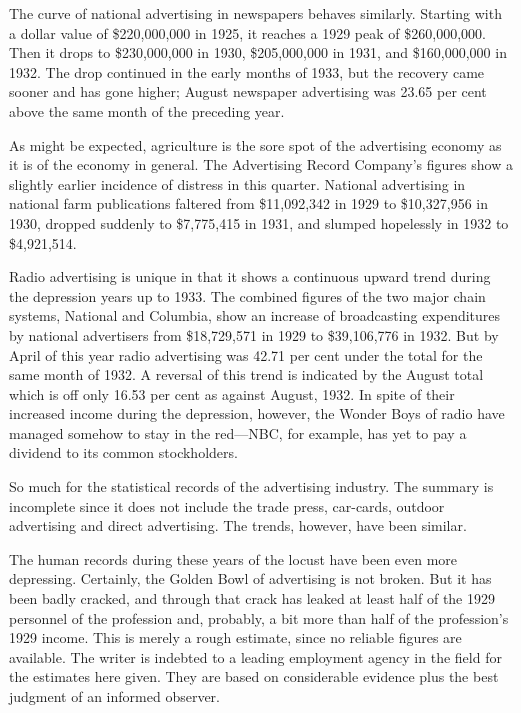 \documentclass[nohyper,openany,nobib]{tufte-book}
\begin{document}
The curve of national advertising in newspapers behaves similarly.
Starting with a dollar value of \$220,000,000 in 1925, it reaches a 1929
peak of \$260,000,000. Then it drops to \$230,000,000 in 1930,
\$205,000,000 in 1931, and \$160,000,000 in 1932. The drop continued in
the early months of 1933, but the recovery came sooner and has gone
higher; August newspaper advertising was 23.65 per cent above the same
month of the preceding year.

As might be expected, agriculture is the sore spot of the advertising
economy as it is of the economy in general. The Advertising Record
Company's figures show a slightly earlier incidence of distress in this
quarter. National advertising in national farm publications faltered
from \$11,092,342 in 1929 to \$10,327,956 in 1930, dropped suddenly to
\$7,775,415 in 1931, and slumped hopelessly in 1932 to \$4,921,514.

Radio advertising is unique in that it shows a continuous upward trend
during the depression years up to 1933. The combined figures of the two
major chain systems, National and Columbia, show an increase of
broadcasting expenditures by national advertisers from \$18,729,571 in
1929 to \$39,106,776 in 1932. But by April of this year radio
advertising was 42.71 per cent under the total for the same month of
1932. A reversal of this trend is indicated by the August total which is
off only 16.53 per cent as against August, 1932. In spite of their
increased income during the depression, however, the Wonder Boys of
radio have managed somehow to stay in the red---NBC, for example, has
yet to pay a dividend to its common stockholders.

So much for the statistical records of the advertising industry. The
summary is incomplete since it does not include the trade press,
car-cards, outdoor advertising and direct advertising. The trends,
however, have been similar.

The human records during these years of the locust have been even more
depressing. Certainly, the Golden Bowl of advertising is not broken. But
it has been badly cracked, and through that crack has leaked at least
half of the 1929 personnel of the profession and, probably, a bit more
than half of the profession's 1929 income. This is merely a rough
estimate, since no reliable figures are available. The writer is
indebted to a leading employment agency in the field for the estimates
here given. They are based on considerable evidence plus the best
judgment of an informed observer.
\end{document}
